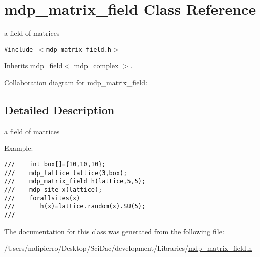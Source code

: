 \hypertarget{classmdp__matrix__field}{
\section{mdp\_\-matrix\_\-field Class Reference}
\label{classmdp__matrix__field}
}
a field of matrices  


{\tt \#include $<$mdp\_\-matrix\_\-field.h$>$}

Inherits \hyperlink{classmdp__field}{mdp\_\-field$<$ mdp\_\-complex $>$}.

Collaboration diagram for mdp\_\-matrix\_\-field:

\subsection{Detailed Description}
a field of matrices 

Example: 

\footnotesize\begin{verbatim}
///    int box[]={10,10,10};
///    mdp_lattice lattice(3,box);
///    mdp_matrix_field h(lattice,5,5);
///    mdp_site x(lattice);
///    forallsites(x)
///       h(x)=lattice.random(x).SU(5);
/// \end{verbatim}
\normalsize
 

The documentation for this class was generated from the following file:\begin{CompactItemize}
\item 
/Users/mdipierro/Desktop/SciDac/development/Libraries/\hyperlink{mdp__matrix__field_8h}{mdp\_\-matrix\_\-field.h}\end{CompactItemize}
